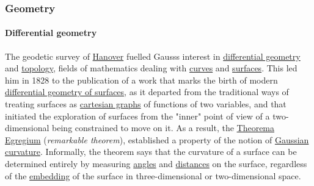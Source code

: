 \subsubsection{Geometry}\label{Geometry}


\paragraph{Differential geometry}\label{Differential_geometry}

The geodetic survey of \href{https://en.wikipedia.org/wiki/Hanover}{Hanover} fuelled Gauss\textquotesingle s interest in \href{https://en.wikipedia.org/wiki/Differential_geometry}{differential geometry} and \href{https://en.wikipedia.org/wiki/Topology}{topology}, fields of mathematics dealing with \href{https://en.wikipedia.org/wiki/Curve}{curves} and \href{https://en.wikipedia.org/wiki/Surface_(topology)}{surfaces}. This led him in 1828 to the publication of a work that marks the birth of modern \href{https://en.wikipedia.org/wiki/Differential_geometry_of_surfaces}{differential geometry of surfaces}, as it departed from the traditional ways of treating surfaces as \href{https://en.wikipedia.org/wiki/Cartesian_coordinate_system}{cartesian graphs} of functions of two variables, and that initiated the exploration of surfaces from the "inner" point of view of a two-dimensional being constrained to move on it. As a result, the \href{https://en.wikipedia.org/wiki/Theorema_Egregium}{Theorema Egregium} (\emph{remarkable theorem}), established a property of the notion of \href{https://en.wikipedia.org/wiki/Gaussian_curvature}{Gaussian curvature}. Informally, the theorem says that the curvature of a surface can be determined entirely by measuring \href{https://en.wikipedia.org/wiki/Angle}{angles} and \href{https://en.wikipedia.org/wiki/Distance}{distances} on the surface, regardless of the \href{https://en.wikipedia.org/wiki/Embedding}{embedding} of the surface in three-dimensional or two-dimensional space.


